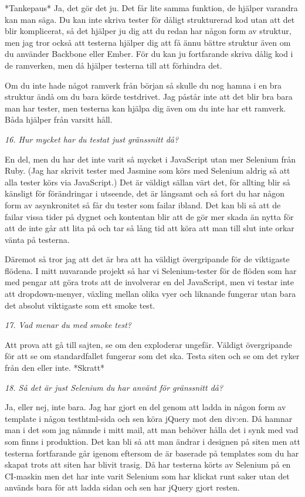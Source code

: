 \documentclass[11pt]{article}
\begin{document}
*Tankepaus* Ja, det gör det ju. Det får lite samma funktion, de hjälper varandra kan man säga. Du kan inte skriva tester för dåligt strukturerad kod utan att det blir komplicerat, så det hjälper ju dig att du redan har någon form av struktur, men jag tror också att testerna hjälper dig att få ännu bättre struktur även om du använder Backbone eller Ember. För du kan ju fortfarande skriva dålig kod i de ramverken, men då hjälper testerna till att förhindra det.

Om du inte hade något ramverk från början så skulle du nog hamna i en bra struktur ändå om du bara körde testdrivet. Jag påstår inte att det blir bra bara man har tester, men testerna kan hjälpa dig även om du inte har ett ramverk. Båda hjälper från varsitt håll.

\emph{16. Hur mycket har du testat just gränssnitt då?}

En del, men du har det inte varit så mycket i JavaScript utan mer Selenium från Ruby. (Jag har skrivit tester med Jasmine som körs med Selenium aldrig så att alla tester körs via JavaScript.) Det är väldigt sällan värt det, för allting blir så känsligt för förändringar i utseende, det är långsamt och så fort du har någon form av asynkronitet så får du tester som failar ibland. Det kan bli så att de failar vissa tider på dygnet och kontentan blir att de gör mer skada än nytta för att de inte går att lita på och tar så lång tid att köra att man till slut inte orkar vänta på testerna.

Däremot så tror jag att det är bra att ha väldigt övergripande för de viktigaste flödena. I mitt nuvarande projekt så har vi Selenium-tester för de flöden som har med pengar att göra trots att de involverar en del JavaScript, men vi testar inte att dropdown-menyer, växling mellan olika vyer och liknande fungerar utan bara det absolut viktigaste som ett smoke test.

\emph{17. Vad menar du med smoke test?}

Att prova att gå till sajten, se om den exploderar ungefär. Väldigt övergripande för att se om standardfallet fungerar som det ska. Testa siten och se om det ryker från den eller inte. *Skratt*

\emph{18. Så det är just Selenium du har använt för gränssnitt då?}

Ja, eller nej, inte bara. Jag har gjort en del genom att ladda in någon form av template i någon testhtml-sida och sen köra jQuery mot den div:en. Då hamnar man i det som jag nämnde i mitt mail, att man behöver hålla det i synk med vad som finns i produktion. Det kan bli så att man ändrar i designen på siten men att testerna fortfarande går igenom eftersom de är baserade på templates som du har skapat trots att siten har blivit trasig. Då har testerna körts av Selenium på en CI-maskin men det har inte varit Selenium som har klickat runt saker utan det används bara för att ladda sidan och sen har jQuery gjort resten.
\end{document}

